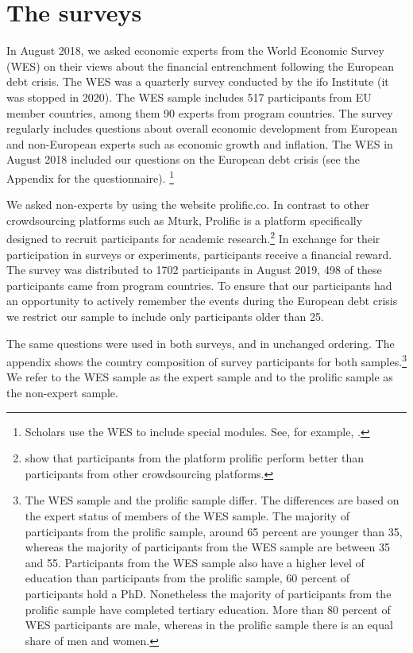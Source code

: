 \section{The surveys }
In August 2018, we asked economic experts from the World
Economic Survey (WES) on their views about the financial
entrenchment following the European debt crisis. The WES was a quarterly
survey conducted by the ifo Institute (it was stopped in 2020). The WES sample includes 517
participants from EU member countries, among them 90 experts from program countries.
The survey regularly includes questions about overall economic development
from European and non-European experts such as economic growth and
inflation. The WES in August 2018 included our
questions on the European debt crisis (see the Appendix for the
questionnaire). \footnote{Scholars use the WES to include special modules. See, for example, \cite{mosler}.}

We asked non-experts by using the website
prolific.co. In contrast to other crowdsourcing platforms such as Mturk,
Prolific is a platform specifically designed to recruit participants for
academic research.\footnote{\cite{Peer} show that participants from
the platform prolific perform better than participants from other
crowdsourcing platforms.} In exchange for their participation in surveys or
experiments, participants receive a financial reward. The survey was
distributed to 1702 participants in August 2019, 498 of these participants
came from program countries. To ensure that our participants had an
opportunity to actively remember the events during the European debt crisis
we restrict our sample to include only participants older than 25.

The same questions were used in both surveys, and in
unchanged ordering. The appendix shows the country composition of survey
participants for both samples.\footnote{%
The WES sample and the prolific sample differ. The differences are based on the expert status of members
of the WES sample. The majority of participants from the prolific sample,
around 65 percent are younger than 35, whereas the majority of participants
from the WES sample are between 35 and 55. Participants from the WES sample
also have a higher level of education than participants from the
prolific sample, 60 percent of participants hold a PhD. Nonetheless the
majority of participants from the prolific sample have completed tertiary
education. More than 80 percent of WES participants are male, whereas in the
prolific sample there is an equal share of men and women.} We refer to the
WES sample as the expert sample and to the prolific sample as the non-expert
sample. 